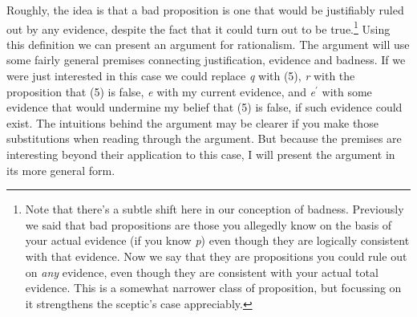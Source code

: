 \noindent Roughly, the idea is that a bad proposition is one that would be justifiably ruled out by any evidence, despite the fact that it could turn out to be true.\footnote{Note that there's a subtle shift here in our conception of badness. Previously we said that bad propositions are those you allegedly know on the basis of your actual evidence (if you know \textit{p}) even though they are logically consistent with that evidence. Now we say that they are propositions you could rule out on \textit{any} evidence, even though they are consistent with your actual total evidence. This is a somewhat narrower class of proposition, but focussing on it strengthens the sceptic's case appreciably.} Using this definition we can present an argument for rationalism. The argument will use some fairly general premises connecting justification, evidence and badness. If we were just interested in this case we could replace \textit{q} with (5), \textit{r} with the proposition that (5) is false, \textit{e} with my current evidence, and \textit{e}\(^\prime\) with some evidence that would undermine my belief that (5) is false, if such evidence could exist. The intuitions behind the argument may be clearer if you make those substitutions when reading through the argument. But because the premises are interesting beyond their application to this case, I will present the argument in its more general form.

\bigskip


